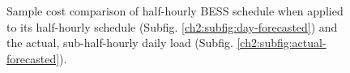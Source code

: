 \begin{figure}[htb]\centering
	\hspace{0mm}
	\caption{Sample cost comparison of half-hourly BESS schedule when applied to its half-hourly schedule (Subfig. \ref{ch2:subfig:day-forecasted}) and the actual, sub-half-hourly daily load (Subfig. \ref{ch2:subfig:actual-forecasted}).}
	\label{ch2:fig:cost-sample}
\end{figure}
